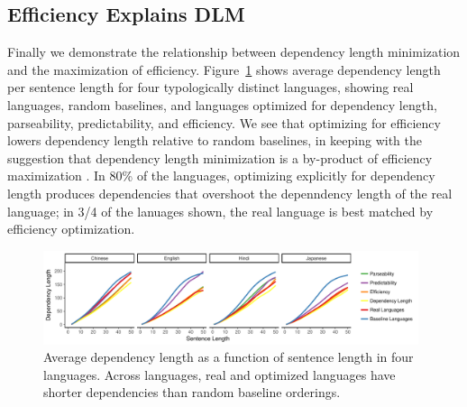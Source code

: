 \documentclass[9pt,twocolumn,twoside,lineno]{pnas-new}
\begin{document}

%

\subsection{Efficiency Explains DLM}
Finally we demonstrate the relationship between dependency length minimization and the maximization of efficiency. Figure~\ref{fig:deplength} shows average dependency length per sentence length for four typologically distinct languages, showing real languages, random baselines, and languages optimized for dependency length, parseability, predictability, and efficiency. We see that optimizing for efficiency lowers dependency length relative to random baselines, in keeping with the suggestion that dependency length minimization is a by-product of efficiency maximization \cite{futrell2017memory}. In 80\% of the languages, optimizing explicitly for dependency length produces dependencies that overshoot the depenndency length of the real language; in 3/4 of the lanuages shown, the real language is best matched by efficiency optimization.

\begin{figure} %
\includegraphics[width=0.98\textwidth]{../results/dependency-length/figures/depLength-facet.pdf}
\caption{Average dependency length as a function of sentence length in four languages. Across languages, real and optimized languages have shorter dependencies than random baseline orderings.}\label{fig:deplength}
\end{figure}
\end{document}
